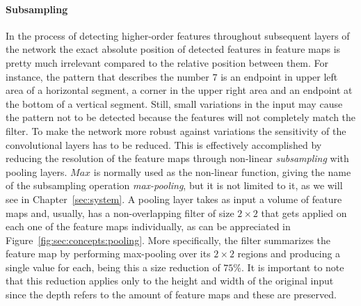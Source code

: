 \paragraph{Subsampling}
In the process of detecting higher-order features throughout subsequent layers of the network the exact absolute position of detected features in feature maps is pretty much irrelevant compared to the relative position between them.
For instance, the pattern that describes the number $7$ is an endpoint in upper left area of a horizontal segment, a corner in the upper right area and an endpoint at the bottom of a vertical segment.
Still, small variations in the input may cause the pattern not to be detected because the features will not completely match the filter.
To make the network more robust against variations the sensitivity of the convolutional layers has to be reduced.
This is effectively accomplished by reducing the resolution of the feature maps through non-linear \emph{subsampling} with pooling layers.
$Max$ is normally used as the non-linear function, giving the name of the subsampling operation \emph{max-pooling}, but it is not limited to it, as we will see in Chapter~\ref{sec:system}.
A pooling layer takes as input a volume of feature maps and, usually, has a non-overlapping filter of size ${2}\times{2}$ that gets applied on each one of the feature maps individually, as can be appreciated in Figure~\ref{fig:sec:concepts:pooling}.
More specifically, the filter summarizes the feature map by performing max-pooling over its ${2}\times{2}$ regions and producing a single value for each, being this a size reduction of $75\%$.
It is important to note that this reduction applies only to the height and width of the original input since the depth refers to the amount of feature maps and these are preserved.

